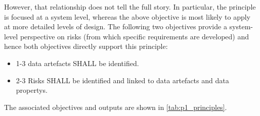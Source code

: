 However, that relationship does not tell the full story. In particular, the principle is focused at a system level, whereas the above objective is most likely to apply at more detailed levels of design. The following two objectives provide a system-level perspective on risks (from which specific requirements are developed) and hence both objectives directly support this principle:

\begin{itemize}
	\item \textcolor{dsiwgAccentColour}{1-3} \Glspl{data artefact} SHALL be identified.
	\item \textcolor{dsiwgAccentColour}{2-3} Risks SHALL be identified and linked to \glspl{data artefact} and \glspl{data property}.
\end{itemize}
\cbstart
The associated objectives and outputs are shown in \ref{tab:p1_principles}.

